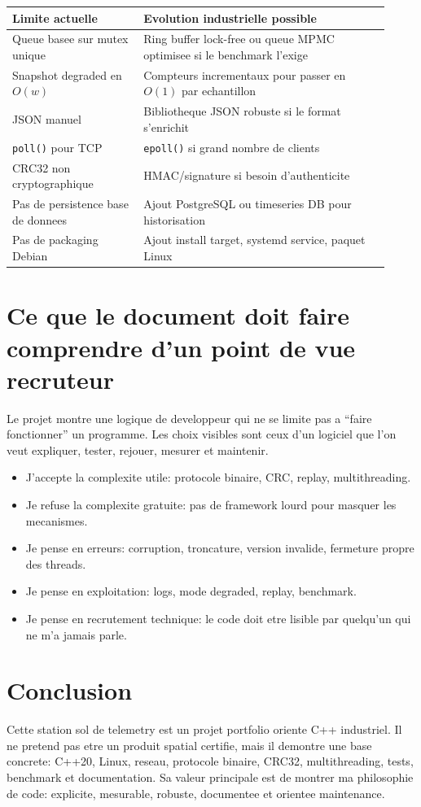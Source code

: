 \documentclass[10pt,a4paper]{article}
\begin{document}
\begin{longtable}{@{}p{0.32\linewidth}p{0.60\linewidth}@{}}
\toprule
Limite actuelle & Evolution industrielle possible \\
\midrule
Queue basee sur mutex unique & Ring buffer lock-free ou queue MPMC optimisee si le benchmark l'exige \\
Snapshot degraded en $O(w)$ & Compteurs incrementaux pour passer en $O(1)$ par echantillon \\
JSON manuel & Bibliotheque JSON robuste si le format s'enrichit \\
\texttt{poll()} pour TCP & \texttt{epoll()} si grand nombre de clients \\
CRC32 non cryptographique & HMAC/signature si besoin d'authenticite \\
Pas de persistence base de donnees & Ajout PostgreSQL ou timeseries DB pour historisation \\
Pas de packaging Debian & Ajout install target, systemd service, paquet Linux \\
\bottomrule
\end{longtable}

\section{Ce que le document doit faire comprendre d'un point de vue recruteur}

Le projet montre une logique de developpeur qui ne se limite pas a ``faire fonctionner'' un programme. Les choix visibles sont ceux d'un logiciel que l'on veut expliquer, tester, rejouer, mesurer et maintenir.

\begin{itemize}
  \item J'accepte la complexite utile: protocole binaire, CRC, replay, multithreading.
  \item Je refuse la complexite gratuite: pas de framework lourd pour masquer les mecanismes.
  \item Je pense en erreurs: corruption, troncature, version invalide, fermeture propre des threads.
  \item Je pense en exploitation: logs, mode degraded, replay, benchmark.
  \item Je pense en recrutement technique: le code doit etre lisible par quelqu'un qui ne m'a jamais parle.
\end{itemize}

\section{Conclusion}

Cette station sol de telemetry est un projet portfolio oriente C++ industriel. Il ne pretend pas etre un produit spatial certifie, mais il demontre une base concrete: C++20, Linux, reseau, protocole binaire, CRC32, multithreading, tests, benchmark et documentation. Sa valeur principale est de montrer ma philosophie de code: explicite, mesurable, robuste, documentee et orientee maintenance.
\end{document}
